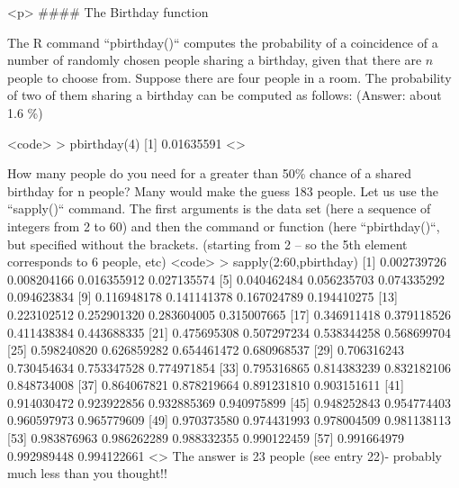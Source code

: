 <p>
#### {The Birthday function}

The R command ``pbirthday()`` computes the probability of a coincidence of a number of randomly chosen people sharing a birthday, given that there are $n$ people to choose from.
Suppose there are four people in a room. The probability of two of them sharing a birthday can be computed as follows: (Answer:  about 1.6 \%)

<code>
> pbirthday(4)
[1] 0.01635591
<\code>



\noindent How many people do you need for a greater than 50\% chance of a shared birthday for n people? Many would make the guess 183 people.  Let us use the ``sapply()`` command. The first arguments is the data set (here a sequence of integers from 2 to 60) and then the command or function (here ``pbirthday()``, but specified without the brackets.
(starting from 2 – so the 5th element corresponds to 6 people, etc)
<code>
 > sapply(2:60,pbirthday)
 [1] 0.002739726 0.008204166 0.016355912 0.027135574
 [5] 0.040462484 0.056235703 0.074335292 0.094623834
 [9] 0.116948178 0.141141378 0.167024789 0.194410275
[13] 0.223102512 0.252901320 0.283604005 0.315007665
[17] 0.346911418 0.379118526 0.411438384 0.443688335
[21] 0.475695308 0.507297234 0.538344258 0.568699704
[25] 0.598240820 0.626859282 0.654461472 0.680968537
[29] 0.706316243 0.730454634 0.753347528 0.774971854
[33] 0.795316865 0.814383239 0.832182106 0.848734008
[37] 0.864067821 0.878219664 0.891231810 0.903151611
[41] 0.914030472 0.923922856 0.932885369 0.940975899
[45] 0.948252843 0.954774403 0.960597973 0.965779609
[49] 0.970373580 0.974431993 0.978004509 0.981138113
[53] 0.983876963 0.986262289 0.988332355 0.990122459
[57] 0.991664979 0.992989448 0.994122661
<\code>
The answer is 23 people (see entry 22)- probably much less than you thought!!





